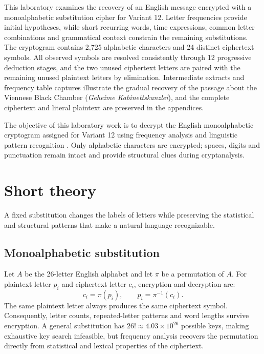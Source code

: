 \documentclass{utmreport}
\begin{document}
\makeutmreporttitlepage
\tableofcontents
\clearpage
\begin{utmabstract}[Abstract]
This laboratory examines the recovery of an English message encrypted with a monoalphabetic substitution cipher for Variant 12. Letter frequencies provide initial hypotheses, while short recurring words, time expressions, common letter combinations and grammatical context constrain the remaining substitutions. The cryptogram contains 2,725 alphabetic characters and 24 distinct ciphertext symbols. All observed symbols are resolved consistently through 12 progressive deduction stages, and the two unused ciphertext letters are paired with the remaining unused plaintext letters by elimination. Intermediate extracts and frequency table captures illustrate the gradual recovery of the passage about the Viennese Black Chamber (\textit{Geheime Kabinettskanzlei}), and the complete ciphertext and literal plaintext are preserved in the appendices.
\par{}
\end{utmabstract}

\utmintroduction
The objective of this laboratory work is to decrypt the English monoalphabetic cryptogram assigned for Variant 12 using frequency analysis and linguistic pattern recognition \cite{repo}. Only alphabetic characters are encrypted; spaces, digits and punctuation remain intact and provide structural clues during cryptanalysis.

\chapter{Short theory}
A fixed substitution changes the labels of letters while preserving the statistical and structural patterns that make a natural language recognizable.

\section{Monoalphabetic substitution}
Let $A$ be the 26-letter English alphabet and let $\pi$ be a permutation of $A$. For plaintext letter $p_i$ and ciphertext letter $c_i$, encryption and decryption are:
\begin{equation}
c_i=\pi(p_i),\qquad p_i=\pi^{-1}(c_i).
\end{equation}
The same plaintext letter always produces the same ciphertext symbol. Consequently, letter counts, repeated-letter patterns and word lengths survive encryption. A general substitution has $26!\approx4.03\times10^{26}$ possible keys, making exhaustive key search infeasible, but frequency analysis recovers the permutation directly from statistical and lexical properties of the ciphertext.
\end{document}
